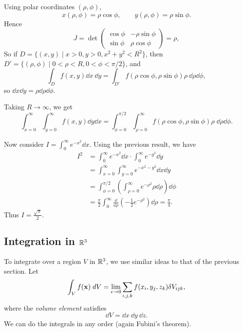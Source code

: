 \documentclass[a4paper]{scrartcl}
\begin{document}
\begin{example}
	Using polar coordinates $(\rho, \phi)$,
	$$
	x(\rho, \phi) = \rho \cos \phi, \quad \quad y(\rho, \phi) = \rho \sin \phi.
	$$
	Hence 
	$$
	J = \det \begin{pmatrix}
		\cos \phi & - \rho \sin \phi \\
		\sin \phi & \rho \cos \phi
	\end{pmatrix} = \rho,
	$$
	So if $D = \{(x, y)  \mid x > 0, y > 0, x^2 + y^2 < R^2 \}$, then $D' = \{(\rho, \phi) \mid 0 < \rho < R, 0 < \phi < \pi/2\}$, and
	$$
	\int_D f(x, y) \dd x\ \dd y = \int_{D'} f(\rho \cos \phi, \rho \sin \phi) \rho\  \dd \rho \dd \phi,
	$$
	so $\dd x \dd y = \rho \dd \rho \dd \phi$.

	Taking $R \rightarrow \infty$, we get
	$$
	\int_{x = 0}^{\infty} \int_{y = 0}^{\infty} f(x, y) \dd y \dd x = \int_{\phi = 0}^{\pi/2} \int_{\rho = 0}^{\infty} f(\rho \cos \phi, \rho \sin \phi) \rho \; \dd \rho \dd\phi.
	$$

	Now consider $I = \int_0^{\infty} e^{-x^2} \dd x$. Using the previous result, we have
	\begin{align*}
		I^2 &= \int_{0}^{\infty} e^{-x^{2}} \dd x \cdot \int_{0}^{\infty} e^{-y^{2}} \dd y \\
			&= \int_{x=0}^{\infty} \int_{y=0}^{\infty} e^{-x^{2}-y^{2}} \dd x \dd y \\
			&= \int_{\phi = 0}^{\pi/2} \left(\int_{\rho = 0}^{\infty} e^{- \rho^2} \rho \dd\rho \right) \dd \phi \\
			&= \frac{\pi}{2} \int_0^{\infty} \frac{\dd}{\dd \rho} \left(-\frac{1}{2} e^{- \rho^2}\right) \dd \rho = \frac{\pi}{4}.
	\end{align*}
	Thus $I = \frac{\sqrt{\pi}}{2}$.
\end{example}

\subsection{Integration in $\mathbb{R}^3$}

To integrate over a region $V$ in $\mathbb{R}^3$, we use similar ideas to that of the previous section. Let
$$
	\int_V f(\mathbf{x}) \; d V = \lim_{\epsilon \to 0} \sum_{i, j, k} f(x_i, y_j, z_k) \delta V_{ijk},
$$
where the \emph{volume element} satisfies
$$
\dd V = \dd x \ \dd y \ \dd z.
$$
We can do the integrals in any order (again Fubini's theorem).
\end{document}
